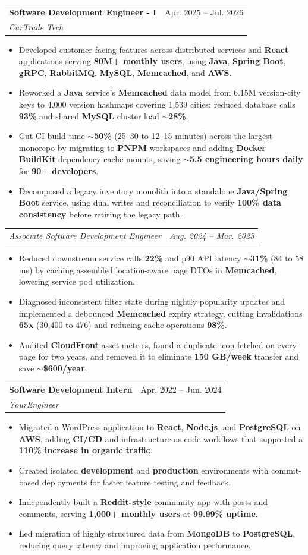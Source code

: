 \documentclass[letterpaper,11pt]{article}
\makeatletter
\newcommand{\resumeItem}[1]{
  \item\small{
    {#1 \vspace{-2pt}}
  }
}
\newcommand{\resumeSubheading}[4]{
  \vspace{-2pt}\item
    \begin{tabular*}{0.97\textwidth}[t]{l@{\extracolsep{\fill}}r}
      \textbf{#1} & #2 \\
      \textit{\small#3} & \textit{\small #4} \\
    \end{tabular*}\vspace{-7pt}
}
\newcommand{\resumeSubSubheading}[2]{
    \item
    \begin{tabular*}{0.97\textwidth}{l@{\extracolsep{\fill}}r}
      \textit{\small#1} & \textit{\small #2} \\
    \end{tabular*}\vspace{-7pt}
}
\newcommand{\resumeItemListStart}{\begin{itemize}}
\newcommand{\resumeItemListEnd}{\end{itemize}\vspace{-5pt}}
\makeatother
\begin{document}
\resumeSubheading
{Software Development Engineer - I}{Apr. 2025 -- Jul. 2026}
{CarTrade Tech}{ }
\resumeItemListStart
\resumeItem{Developed customer-facing features across distributed services and \textbf{React} applications serving \textbf{80M+ monthly users}, using \textbf{Java}, \textbf{Spring Boot}, \textbf{gRPC}, \textbf{RabbitMQ}, \textbf{MySQL}, \textbf{Memcached}, and \textbf{AWS}.}
\resumeItem{Reworked a \textbf{Java} service's \textbf{Memcached} data model from 6.15M version-city keys to 4,000 version hashmaps covering 1,539 cities; reduced database calls \textbf{93\%} and shared \textbf{MySQL} cluster load \textbf{$\sim$28\%}.}
\resumeItem{Cut CI build time \textbf{$\sim$50\%} (25--30 to 12--15 minutes) across the largest monorepo by migrating to \textbf{PNPM} workspaces and adding \textbf{Docker BuildKit} dependency-cache mounts, saving \textbf{$\sim$5.5 engineering hours daily} for \textbf{90+ developers}.}
\resumeItem{Decomposed a legacy inventory monolith into a standalone \textbf{Java/Spring Boot} service, using dual writes and reconciliation to verify \textbf{100\% data consistency} before retiring the legacy path.}
\resumeItemListEnd
\resumeSubSubheading
{Associate Software Development Engineer}{Aug. 2024 -- Mar. 2025}
\resumeItemListStart
\resumeItem{Reduced downstream service calls \textbf{22\%} and p90 API latency \textbf{$\sim$31\%} (84 to 58 ms) by caching assembled location-aware page DTOs in \textbf{Memcached}, lowering service pod utilization.}
\resumeItem{Diagnosed inconsistent filter state during nightly popularity updates and implemented a debounced \textbf{Memcached} expiry strategy, cutting invalidations \textbf{65x} (30,400 to 476) and reducing cache operations \textbf{98\%}.}
\resumeItem{Audited \textbf{CloudFront} asset metrics, found a duplicate icon fetched on every page for two years, and removed it to eliminate \textbf{150 GB/week} transfer and save \textbf{$\sim$\$600/year}.}
\resumeItemListEnd

\resumeSubheading
{Software Development Intern}{Apr. 2022 -- Jun. 2024}
{YourEngineer}{ }
\resumeItemListStart
\resumeItem{Migrated a WordPress application to \textbf{React}, \textbf{Node.js}, and \textbf{PostgreSQL} on \textbf{AWS}, adding \textbf{CI/CD} and infrastructure-as-code workflows that supported a \textbf{110\% increase in organic traffic}.}
\resumeItem{Created isolated \textbf{development} and \textbf{production} environments with commit-based deployments for faster feature testing and feedback.}
\resumeItem{Independently built a \textbf{Reddit-style} community app with posts and comments, serving \textbf{1,000+ monthly users} at \textbf{99.99\% uptime}.}
\resumeItem{Led migration of highly structured data from \textbf{MongoDB} to \textbf{PostgreSQL}, reducing query latency and improving application performance.}
\resumeItemListEnd
\end{document}
